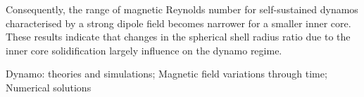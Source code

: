 \documentclass[mreferee]{gji}
\begin{document}
\begin{summary}
{Consequently, the range of magnetic Reynolds number for self-sustained dynamos characterised by a strong dipole field becomes narrower for a smaller inner core.
}
These results indicate that changes in the spherical shell radius ratio due to the inner core solidification largely influence on the dynamo regime.
\end{summary}
%
\begin{keywords}
Dynamo: theories and simulations; Magnetic field variations through time; Numerical solutions
\end{keywords}
%

%

%

%

%

%

%
\end{document}
